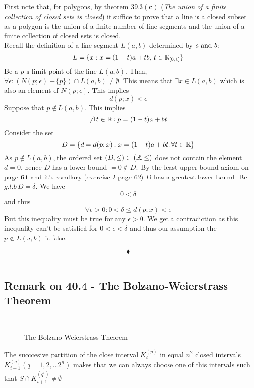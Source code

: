 First note that, for polygons, by theorem $\mathbf{39.3 (c)}$ (\textit{The
union of a finite collection of closed sets is closed}) it suffice to prove that a line is a closed subset as a polygon is the union of a finite number of line segments and the union of a finite collection of closed sets is closed.\\
Recall the definition of a line segment $L(a,b)$ determined by $a \text{ and } b$:\\
$$L=\{x:x=(1-t)a+tb,\, t\in \mathbb{R}_{[0,1]}\}$$
Be a $p$ a limit point of the line $L(a,b)$. Then, $\forall \epsilon: \left( N(p;\epsilon)-\{p\}\right)\cap L(a,b)\neq \emptyset$. This means that $\exists x\in L(a,b)$ which is also an element of $N(p;\epsilon)$. This implies 
$$ d(p;x)<\epsilon$$
Suppose that $p\not\in L(a,b)$. This implies
$$\not\exists\, t\in\mathbb{R} : p= (1-t)a+bt$$
Consider the set $$D=\{d=d(p;x):x= (1-t)a+bt,\forall t\in\mathbb{R} \}$$
As $p\not\in L(a,b)$, the ordered set $(D,\leq)\subset (\mathbb{R},\leq)$ does not contain the element $d=0$, hence $D$ has a lower bound $=0\not \in D$.\
By the least upper bound axiom on page $\mathbf{61}$ and it's corollary (exercise $2$ page $62$) $D$ has a greatest lower bound. Be $g.l.b\,  D=\delta$. We have 
$$0<\delta$$ and thus 
$$\forall\epsilon >0: 0<\delta \leq d(p;x)<\epsilon$$
But this inequality must be true for any $\epsilon>0$. We get a contradiction as this inequality can't be satisfied for $0<\epsilon <\delta$ and thus our assumption the $p\not\in L(a,b)$ is false.


$$\blacklozenge$$\\
\newpage

\subsection*{Remark on 40.4 -  The Bolzano-Weierstrass Theorem}
\begin{figure}[H]%
    \centering
\\
\caption{The Bolzano-Weierstrass Theorem}
\label{fig:fig_p8a}
\end{figure}
The succcesive partition of the close interval $K^{(p)}_i$ in equal $n^2$ closed intervals $K^{(q)}_{i+1}(q=1,2,\dots 2^n)$  makes that we can always choose one of this intervals such that $S\cap K^{(q^{'})}_{i+1}\neq \emptyset$
\newpage
\renewcommand{\thesubsection}{\thesection.\arabic{subsection}}
\setcounter{subsection}{0}



